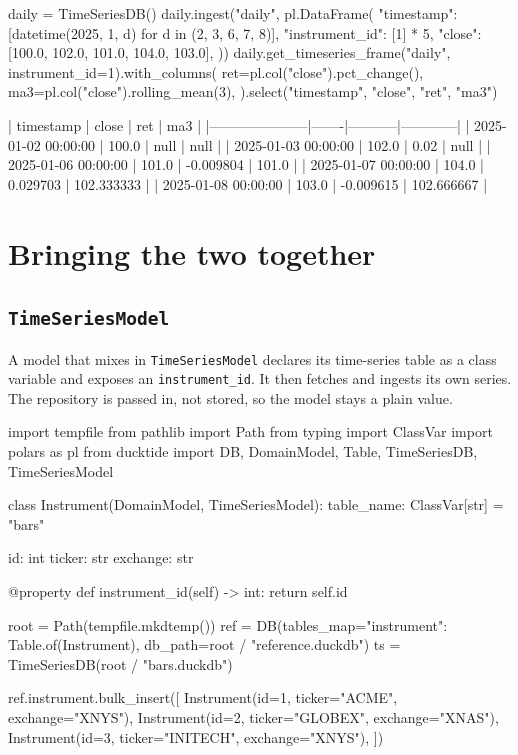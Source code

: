 \documentclass[11pt,a4paper]{article}
\newcommand{\code}[1]{\texttt{#1}}
\begin{document}
\begin{python}
daily = TimeSeriesDB()
daily.ingest("daily", pl.DataFrame({
    "timestamp": [datetime(2025, 1, d) for d in (2, 3, 6, 7, 8)],
    "instrument_id": [1] * 5,
    "close": [100.0, 102.0, 101.0, 104.0, 103.0],
}))
daily.get_timeseries_frame("daily", instrument_id=1).with_columns(
    ret=pl.col("close").pct_change(),
    ma3=pl.col("close").rolling_mean(3),
).select("timestamp", "close", "ret", "ma3")
\end{python}
\begin{console}
| timestamp           | close | ret       | ma3        |
|---------------------|-------|-----------|------------|
| 2025-01-02 00:00:00 | 100.0 | null      | null       |
| 2025-01-03 00:00:00 | 102.0 | 0.02      | null       |
| 2025-01-06 00:00:00 | 101.0 | -0.009804 | 101.0      |
| 2025-01-07 00:00:00 | 104.0 | 0.029703  | 102.333333 |
| 2025-01-08 00:00:00 | 103.0 | -0.009615 | 102.666667 |
\end{console}

\section{Bringing the two together}
\label{sec:bridge}

\subsection{\code{TimeSeriesModel}}

A model that mixes in \code{TimeSeriesModel} declares its time-series table as a class
variable and exposes an \code{instrument\_id}. It then fetches and ingests its own series.
The repository is passed in, not stored, so the model stays a plain value.

\begin{python}
import tempfile
from pathlib import Path
from typing import ClassVar
import polars as pl
from ducktide import DB, DomainModel, Table, TimeSeriesDB, TimeSeriesModel

class Instrument(DomainModel, TimeSeriesModel):
    table_name: ClassVar[str] = "bars"

    id: int
    ticker: str
    exchange: str

    @property
    def instrument_id(self) -> int:
        return self.id

root = Path(tempfile.mkdtemp())
ref = DB(tables_map={"instrument": Table.of(Instrument)}, db_path=root / "reference.duckdb")
ts = TimeSeriesDB(root / "bars.duckdb")

ref.instrument.bulk_insert([
    Instrument(id=1, ticker="ACME", exchange="XNYS"),
    Instrument(id=2, ticker="GLOBEX", exchange="XNAS"),
    Instrument(id=3, ticker="INITECH", exchange="XNYS"),
])
\end{python}
\end{document}

